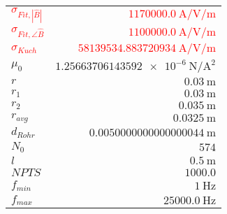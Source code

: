 
{%
    \begin{center}
    \label{tab:fitparams:st:freq:approx2}
    \begin{tabular}{lr}
    \toprule
        \textcolor{red}{$\sigma_{Fit,|\hat{B}|}$} & \textcolor{red}{$\SI{1170000.0}{\ampere\per\volt\per\meter}$}\\
        \textcolor{red}{$\sigma_{Fit,\angle\hat{B}}$} & \textcolor{red}{$\SI{1100000.0}{\ampere\per\volt\per\meter}$}\\
        \textcolor{red}{$\sigma_{Kuch}$} & \textcolor{red}{$\SI{58139534.883720934}{\ampere\per\volt\per\meter}$}\\
        $\mu_0$ & $\SI{1.25663706143592e-6}{\newton\per\ampere\squared}$\\
        $r$ & $\SI{0.03}{\meter}$\\
        $r_1$ & $\SI{0.03}{\meter}$\\
        $r_2$ & $\SI{0.035}{\meter}$\\
        $r_{avg}$ & $\SI{0.0325}{\meter}$\\
        $d_{Rohr}$ & $\SI{0.0050000000000000044}{\meter}$\\
        $N_0$ & $\num{574}$\\
        $l$ & $\SI{0.5}{\meter}$\\
        $NPTS$ & $\num{1000.0}$\\
        $f_{min}$ & $\SI{1}{\hertz}$\\
        $f_{max}$ & $\SI{25000.0}{\hertz}$\\

    \bottomrule
    \end{tabular}
    \end{center}
}

